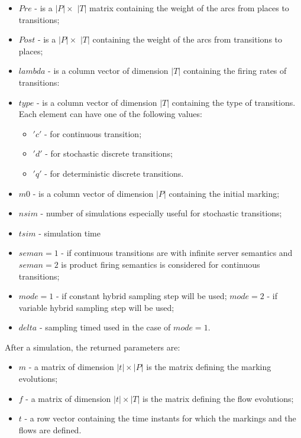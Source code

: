\begin{itemize}
\item $Pre$ - is a $|P| \times$ $|T|$ matrix containing the weight of the arcs from places to transitions;
\item $Post$ - is a $|P| \times$ $|T|$   containing the weight of the arcs from transitions to places;
\item $lambda$ - is a column vector of dimension $|T|$ containing the firing rates of transitions:
\item $type$ - is a column vector of dimension $|T|$ containing the type of transitions. Each element can have one of the following values:
\begin{itemize}
\item $'c'$ - for continuous transition;
\item $'d'$ - for stochastic discrete transitions;
\item $'q'$ -  for deterministic  discrete transitions.
\end{itemize}
\item $m0$ - is a column vector of dimension $|P|$ containing the initial marking;
\item $nsim$ - number of simulations especially useful for stochastic transitions;
\item $tsim$ - simulation time
\item $seman = 1$ - if continuous transitions are with infinite server semantics and $seman = 2$ is product firing semantics is considered for continuous transitions;
\item $mode = 1$ - if constant hybrid sampling step will be used;  $mode = 2$ - if variable hybrid sampling step will be used;  
\item $delta$ - sampling timed used in the case of $mode = 1$.
\end{itemize}
 
 After a simulation, the returned parameters are:

\begin{itemize} 
\item $m$ - a matrix of dimension $|t| \times |P|$ is the matrix defining the marking evolutions;
\item $f$ - a matrix of dimension $|t| \times |T|$ is the matrix defining the flow evolutions;
\item $t$ - a row vector containing the time instants for which the markings and the flows are defined.
\end{itemize}

\newpage

